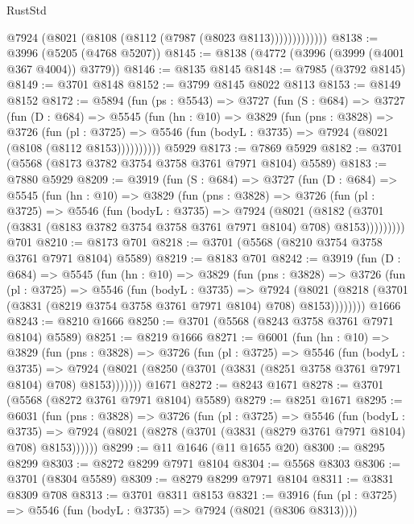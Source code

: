 \begin{lexlean}{RustStd}
\begin{coremodule}
                  @7924 (@8021 (@8108 (@8112 (@7987 (@8023 @8113)))))))))))))
@8138 := @3996 (@5205 (@4768 @5207))
@8145 := @8138 (@4772 (@3996 (@3999 (@4001 @367 @4004)) @3779))
@8146 := @8135 @8145
@8148 := @7985 (@3792 @8145)
@8149 := @3701 @8148
@8152 := @3799 @8145 @8022 @8113
@8153 := @8149 @8152
@8172 := @5894
    (fun (ps : @5543) =>
    @3727
      (fun (S : @684) =>
      @3727
        (fun (D : @684) =>
        @5545
          (fun (hn : @10) =>
          @3829
            (fun (pns : @3828) =>
            @3726
              (fun (pl : @3725) =>
              @5546 (fun (bodyL : @3735) => @7924 (@8021 (@8108 (@8112 @8153))))))))))
    @5929
@8173 := @7869 @5929
@8182 := @3701 (@5568 (@8173 @3782 @3754 @3758 @3761 @7971 @8104) @5589)
@8183 := @7880 @5929
@8209 := @3919
    (fun (S : @684) =>
    @3727
      (fun (D : @684) =>
      @5545
        (fun (hn : @10) =>
        @3829
          (fun (pns : @3828) =>
          @3726
            (fun (pl : @3725) =>
            @5546
              (fun (bodyL : @3735) =>
              @7924
                (@8021
                  (@8182
                    (@3701 (@3831 (@8183 @3782 @3754 @3758 @3761 @7971 @8104) @708) @8153)))))))))
    @701
@8210 := @8173 @701
@8218 := @3701 (@5568 (@8210 @3754 @3758 @3761 @7971 @8104) @5589)
@8219 := @8183 @701
@8242 := @3919
    (fun (D : @684) =>
    @5545
      (fun (hn : @10) =>
      @3829
        (fun (pns : @3828) =>
        @3726
          (fun (pl : @3725) =>
          @5546
            (fun (bodyL : @3735) =>
            @7924
              (@8021 (@8218 (@3701 (@3831 (@8219 @3754 @3758 @3761 @7971 @8104) @708) @8153))))))))
    @1666
@8243 := @8210 @1666
@8250 := @3701 (@5568 (@8243 @3758 @3761 @7971 @8104) @5589)
@8251 := @8219 @1666
@8271 := @6001
    (fun (hn : @10) =>
    @3829
      (fun (pns : @3828) =>
      @3726
        (fun (pl : @3725) =>
        @5546
          (fun (bodyL : @3735) =>
          @7924 (@8021 (@8250 (@3701 (@3831 (@8251 @3758 @3761 @7971 @8104) @708) @8153)))))))
    @1671
@8272 := @8243 @1671
@8278 := @3701 (@5568 (@8272 @3761 @7971 @8104) @5589)
@8279 := @8251 @1671
@8295 := @6031
    (fun (pns : @3828) =>
    @3726
      (fun (pl : @3725) =>
      @5546
        (fun (bodyL : @3735) =>
        @7924 (@8021 (@8278 (@3701 (@3831 (@8279 @3761 @7971 @8104) @708) @8153))))))
@8299 := @11 @1646 (@11 @1655 @20)
@8300 := @8295 @8299
@8303 := @8272 @8299 @7971 @8104
@8304 := @5568 @8303
@8306 := @3701 (@8304 @5589)
@8309 := @8279 @8299 @7971 @8104
@8311 := @3831 @8309 @708
@8313 := @3701 @8311 @8153
@8321 := @3916
    (fun (pl : @3725) => @5546 (fun (bodyL : @3735) => @7924 (@8021 (@8306 @8313))))

\end{coremodule}
\end{lexlean}
